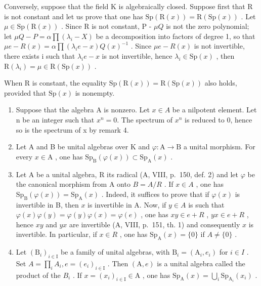 Conversely, suppose that the field K is algebraically closed. Suppose first that R is not constant and let us prove that one has \(\mathrm{Sp}(\mathrm{R}(x)) = \mathrm{R}(\mathrm{Sp}(x))\) . Let \(\mu \in \mathrm{Sp}(\mathrm{R}(x))\) . Since R is not constant, P - \(\mu Q\) is not the zero polynomial; let \(\mu Q - P = \alpha \prod (\lambda_i - X)\) be a decomposition into factors of degree 1, so that \(\mu e - R(x) = \alpha \prod (\lambda_i e - x) Q(x)^{-1}\) . Since \(\mu e - R(x)\) is not invertible, there exists i such that \(\lambda_i e - x\) is not invertible, hence \(\lambda_i \in \mathrm{Sp}(x)\) , then \(\mathrm{R}(\lambda_i) = \mu \in \mathrm{R}(\mathrm{Sp}(x))\) .

When R is constant, the equality \(\mathrm{Sp}(\mathrm{R}(x)) = \mathrm{R}(\mathrm{Sp}(x))\) also holds, provided that \(\mathrm{Sp}(x)\) is nonempty.

\begin{enumerate}
\def\labelenumi{\arabic{enumi})}
\setcounter{enumi}{4}
\item
  Suppose that the algebra A is nonzero. Let \(x \in A\) be a nilpotent element. Let n be an integer such that \(x^{n} = 0\). The spectrum of \(x^{n}\) is reduced to 0, hence so is the spectrum of x by remark 4.
\item
  Let A and B be unital algebras over K and \(\varphi\colon\mathrm{A}\to\mathrm{B}\) a unital morphism. For every \(x\in\mathrm{A}\) , one has \(\mathrm{Sp}_{\mathrm{B}}(\varphi(x))\subset\mathrm{Sp}_{\mathrm{A}}(x)\) .
\item
  Let A be a unital algebra, R its radical (A, VIII, p.~150, def. 2) and let \(\varphi\) be the canonical morphism from A onto \(B = A/R\) . If \(x \in A\) , one has \(\mathrm{Sp}_{\mathrm{B}}(\varphi(x)) = \mathrm{Sp}_{\mathrm{A}}(x)\) . Indeed, it suffices to prove that if \(\varphi(x)\) is invertible in B, then \(x\) is invertible in A. Now, if \(y \in A\) is such that \(\varphi(x)\varphi(y) = \varphi(y)\varphi(x) = \varphi(e)\) , one has \(xy \in e + R\) , \(yx \in e + R\) , hence \(xy\) and \(yx\) are invertible (A, VIII, p.~151, th. 1) and consequently \(x\) is invertible. In particular, if \(x \in R\) , one has \(\mathrm{Sp}_{\mathrm{A}}(x) = \{0\}\) if \(A \neq \{0\}\) .
\item
  Let \((\mathrm{B}_{i})_{i\in\mathrm{I}}\) be a family of unital algebras, with \(\mathrm{B}_{i}=(\mathrm{A}_{i},e_{i})\) for \(i\in I\) . Set \(A=\prod_{i}A_{i}, e=(e_{i})_{i\in\mathrm{I}}\) . Then \((\mathrm{A},e)\) is a unital algebra called the product of the \(B_{i}\) . If \(x=(x_{i})_{i\in\mathrm{I}}\in\mathrm{A}\) , one has \(\mathrm{Sp}_{\mathrm{A}}(x)=\bigcup_{i}\mathrm{Sp}_{\mathrm{A}_{i}}(x_{i})\) .
\end{enumerate}

